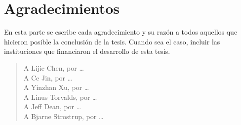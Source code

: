 \chapter*{Agradecimientos}
\thispagestyle{empty}

\vspace{-0.5cm}

En esta parte se escribe cada agradecimiento y su raz\'on a todos aquellos que
hicieron posible la conclusi\'on de la tesis.
Cuando sea el caso, incluir las instituciones que financiaron el desarrollo
de esta tesis.

\begin{verse}
  A Lijie Chen, por \dots \\
  A Ce Jin, por \dots \\
  A Yinzhan Xu, por \dots \\
  A Linus Torvalds, por \dots \\
  A Jeff Dean, por \dots \\
  A Bjarne Strostrup, por \dots \\
\end{verse}
